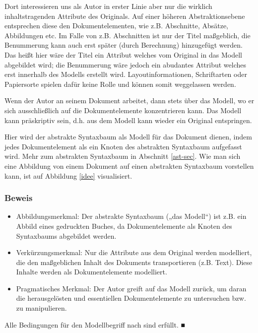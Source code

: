  
Dort interessieren uns als Autor in erster Linie aber nur die wirklich inhaltstragenden Attribute des Originals. Auf einer höheren Abstraktionsebene entsprechen diese den Dokumentelementen, wie z.B. Abschnitte, Absätze, Abbildungen etc. Im Falle von z.B. Abschnitten ist nur der Titel maßgeblich, die Benummerung kann auch erst später (durch Berechnung) hinzugefügt werden. Das heißt hier wäre der Titel ein Attribut welches vom Original in das Modell abgebildet wird; die Benummerung wäre jedoch ein abudantes Attribut welches erst innerhalb des Modells erstellt wird. Layoutinformationen, Schriftarten oder Papiersorte spielen dafür keine Rolle und können somit weggelassen werden.

 
Wenn der Autor an seinem Dokument arbeitet, dann stets über das Modell, wo er sich ausschließlich auf die Dokumentelemente konzentrieren kann. Das Modell kann präskriptiv sein, d.h. aus dem Modell kann wieder ein Original entspringen.

 
Hier wird der abstrakte Syntaxbaum als Modell für das Dokument dienen, indem jedes Dokumentelement als ein Knoten des abstrakten Syntaxbaum aufgefasst wird. Mehr zum abstrakten Syntaxbaum in Abschnitt \ref{ast-sec}. Wie man sich eine Abbildung von einem Dokument auf einen abstrakten Syntaxbaum vorstellen kann, ist auf Abbildung \ref{idee} visualisiert.

 
\subsubsection{Beweis}\label{}

 
\begin{itemize}

\item Abbildungsmerkmal: Der abstrakte Syntaxbaum („das Modell“) ist z.B. ein Abbild eines gedruckten Buches, da Dokumentelemente als Knoten des Syntaxbaums abgebildet werden.
\item Verkürzungsmerkmal: Nur die Attribute aus dem Original werden modelliert, die den maßgeblichen Inhalt des Dokuments transportieren (z.B. Text). Diese Inhalte werden als Dokumentelemente modelliert.
\item Pragmatisches Merkmal: Der Autor greift auf das Modell zurück, um daran die herausgelösten und essentiellen Dokumentelemente zu untersuchen bzw. zu manipulieren.
\end{itemize}
 
Alle Bedingungen für den Modellbegriff nach \citep{Stachowiak} sind erfüllt. ■

